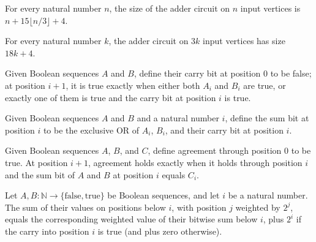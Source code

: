 \begin{theorem}
\label{BoolCircuit.adderCircuit_size}
\leanok
{}
For every natural number $n$, the size of the adder circuit on $n$ input vertices is $n
+ 15\lfloor n/3\rfloor + 4$.
\end{theorem}

\begin{theorem}
\label{BoolCircuit.adderCircuit_size_three_mul}
\leanok
{}
For every natural number $k$, the adder circuit on $3k$ input vertices has size $18k+4$.
\end{theorem}

\begin{definition}
\label{BoolCircuit.carryBit}
\leanok
Given Boolean sequences $A$ and $B$, define their carry bit at position $0$ to be false;
at position $i+1$, it is true exactly when either both $A_i$ and $B_i$ are true, or
exactly one of them is true and the carry bit at position $i$ is true.
\end{definition}

\begin{definition}
\label{BoolCircuit.sumBit}
\leanok
{}
Given Boolean sequences $A$ and $B$ and a natural number $i$, define the sum bit at
position $i$ to be the exclusive OR of $A_i$, $B_i$, and their carry bit at position
$i$.
\end{definition}

\begin{definition}
\label{BoolCircuit.agreeBit}
\leanok
{}
Given Boolean sequences $A$, $B$, and $C$, define agreement through position $0$ to be
true. At position $i+1$, agreement holds exactly when it holds through position $i$ and
the sum bit of $A$ and $B$ at position $i$ equals $C_i$.
\end{definition}

\begin{theorem}
\label{BoolCircuit.prefixVal_add}
\leanok
{}
Let $A,B:\mathbb{N}\to\{\mathrm{false},\mathrm{true}\}$ be Boolean sequences, and let
$i$ be a natural number. The sum of their values on positions below $i$, with position
$j$ weighted by $2^j$, equals the corresponding weighted value of their bitwise sum
below $i$, plus $2^i$ if the carry into position $i$ is true (and plus zero otherwise).
\end{theorem}

